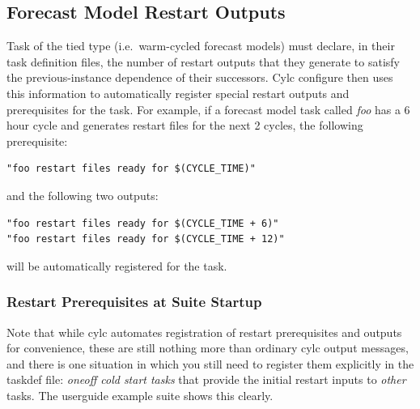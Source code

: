 \documentclass[11pt,a4paper]{article}
\begin{document}
\subsection{Forecast Model Restart Outputs}

Task of the tied type (i.e.\ warm-cycled forecast models) must declare,
in their task definition files, the number of restart outputs that they
generate to satisfy the previous-instance dependence of their
successors. Cylc configure then uses this information to automatically
register special restart outputs and prerequisites for the task. For
example, if a forecast model task called {\em foo} has a 6 hour cycle
and generates restart files for the next 2 cycles, the following
prerequisite:

\begin{lstlisting}
"foo restart files ready for $(CYCLE_TIME)"
\end{lstlisting}

and the following two outputs:

\begin{lstlisting}
"foo restart files ready for $(CYCLE_TIME + 6)"
"foo restart files ready for $(CYCLE_TIME + 12)"
\end{lstlisting}

will be automatically registered for the task.


\subsubsection{Restart Prerequisites at Suite Startup}

Note that while cylc automates registration of restart prerequisites and 
outputs for convenience, these are still nothing more than ordinary cylc
output messages, and there is one situation in which you still need to
register them explicitly in the taskdef file: {\em oneoff cold start
tasks} that provide the initial restart inputs to {\em other} tasks.
The userguide example suite shows this clearly.

\end{document}
